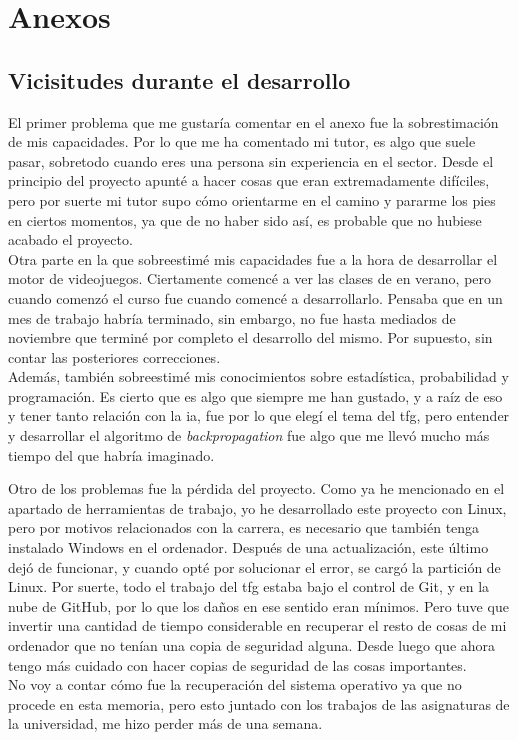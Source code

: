 
\chapter{Anexos}
\section{Vicisitudes durante el desarrollo}
El primer problema que me gustaría comentar en el anexo fue la sobrestimación de mis capacidades. Por lo que me ha comentado mi tutor, es algo que suele pasar, sobretodo cuando eres una persona sin experiencia en el sector. Desde el principio del proyecto apunté a hacer cosas que eran extremadamente difíciles, pero por suerte mi tutor supo cómo orientarme en el camino y pararme los pies en ciertos momentos, ya que de no haber sido así, es probable que no hubiese acabado el proyecto. 
\\
Otra parte en la que sobreestimé mis capacidades fue a la hora de desarrollar el motor de videojuegos. Ciertamente comencé a ver las clases de \cite{CursoMotorC++} en verano, pero cuando comenzó el curso fue cuando comencé a desarrollarlo. Pensaba que en un mes de trabajo habría terminado, sin embargo, no fue hasta mediados de noviembre que terminé por completo el desarrollo del mismo. Por supuesto, sin contar las posteriores correcciones.
\\
Además, también sobreestimé mis conocimientos sobre estadística, probabilidad y programación. Es cierto que es algo que siempre me han gustado, y a raíz de eso y tener tanto relación con la \gls{ia}, fue por lo que elegí el tema del \gls{tfg}, pero entender y desarrollar el algoritmo de \textit{backpropagation} fue algo que me llevó mucho más tiempo del que habría imaginado.

Otro de los problemas fue la pérdida del proyecto. Como ya he mencionado en el apartado de herramientas de trabajo, yo he desarrollado este proyecto con Linux, pero por motivos relacionados con la carrera, es necesario que también tenga instalado Windows en el ordenador. Después de una actualización, este último dejó de funcionar, y cuando opté por solucionar el error, se cargó la partición de Linux. Por suerte, todo el trabajo del \gls{tfg} estaba bajo el control de Git, y en la nube de GitHub, por lo que los daños en ese sentido eran mínimos. Pero tuve que invertir una cantidad de tiempo considerable en recuperar el resto de cosas de mi ordenador que no tenían una copia de seguridad alguna. Desde luego que ahora tengo más cuidado con hacer copias de seguridad de las cosas importantes.
\\
No voy a contar cómo fue la recuperación del sistema operativo ya que no procede en esta memoria, pero esto juntado con los trabajos de las asignaturas de la universidad, me hizo perder más de una semana.


